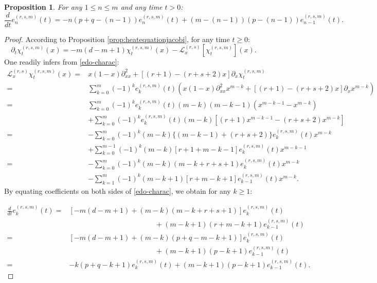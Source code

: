 \documentclass[12pt,reqno]{amsart}
\newtheorem{proposition}{Proposition}
\begin{document}
\begin{proposition}
	\label{prop:diffequ}
	For any $1 \leq n \leq m$ and any time $t > 0$:
	$$
		\frac{d}{dt}e^{(r,s,m)}_{n}(t)  = -n(p+q-(n-1))e_{n}^{(r,s,m)}(t) 
		                                +(m-(n-1))(p-(n-1))e^{(r,s,m)}_{n-1}(t).
	$$
    \end{proposition}
\begin{proof}
	According to Proposition \ref{prop:heatequationjacobi}, for any time $t\geq 0$:
	\begin{equation}\label{edo-charac}
		\partial_t\chi_t^{(r,s,m)}(x) =-m(d-m+1)\chi_t^{(r,s,m)}(x) -\mathcal{L}_x^{(r,s)}[\chi_t^{(r,s,m)}](x).
	\end{equation}
	One readily infers from \eqref{edo-charac}:
	\begin{align*}
		\mathcal{L}_x^{(r,s)}\chi_t^{(r,s,m)}(x)= & x(1-x)\partial_{xx}^2 + [(r+1) - (r+s+2)x]\partial_x\chi_{t}^{(r,s,m)}                                                   \\
		=                                         & \sum_{k=0}^{m}(-1)^ke^{(r,s,m)}_{k}(t)\left(x(1-x)\partial_{xx}^2 x^{m-k}+ [(r+1) - (r+s+2)x]\partial_x x^{m-k}\right)
		\\=&\sum_{k=0}^{m}(-1)^ke^{(r,s,m)}_{k}(t)(m-k)(m-k-1) (x^{m-k-1}-x^{m-k})
		\\&+\sum_{k=0}^{m}(-1)^ke^{(r,s,m)}_{k}(t) (m-k)[(r+1)x^{m-k-1} - (r+s+2)x^{m-k}]
		\\=&-\sum_{k=0}^{m}(-1)^k(m-k)\{(m-k-1)+ (r+s+2)\}e^{(r,s,m)}_{k}(t) x^{m-k}
		\\&+ \sum_{k=0}^{m-1}(-1)^k(m-k)[r+1 +m-k-1]e^{(r,s,m)}_{k}(t)x^{m-k-1}
		\\=&-\sum_{k=0}^{m}(-1)^k(m-k)(m-k+ r+s+1)e^{(r,s,m)}_{k}(t) x^{m-k}
		\\& -\sum_{k=1}^{m}(-1)^k(m-k+1)[r +m-k+1]e^{(r,s,m)}_{k-1}(t)x^{m-k}.
	\end{align*}
	By equating coefficients on both sides of \eqref{edo-charac}, we obtain for any $k \ge 1$:
	
	\begin{align*}
		\frac{d}{dt}e^{(r,s,m)}_{k}(t)= & \left[-m(d-m+1) +(m-k)(m-k+ r+s+1)\right]e^{(r,s,m)}_{k}(t)
		\\&\hspace{5cm}+(m-k+1)(r +m-k+1)e^{(r,s,m)}_{k-1}(t)
		\\=&\left[-m(d-m+1) +(m-k)(p+q-m-k+1)\right]e^{(r,s,m)}_{k}(t)
		\\&\hspace{5cm}+(m-k+1)(p-k+1)e^{(r,s,m)}_{k-1}(t)
		\\=&-k(p+q-k+1)e^{(r,s,m)}_{k}(t)
		+(m-k+1)(p-k+1)e^{(r,s,m)}_{k-1}(t).
	\end{align*}
\end{proof}
\end{document}
